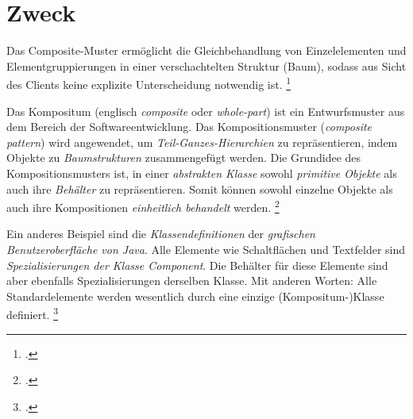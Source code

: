 \documentclass{bschlangaul-haupt}
\begin{document}
\section{Zweck}

Das Composite-Muster ermöglicht die Gleichbehandlung von Einzelelementen
und Elementgruppierungen in einer verschachtelten Struktur (\zB Baum),
sodass aus Sicht des Clients keine explizite Unterscheidung notwendig
ist.
\footcite[Seite 102]{eilebrecht}

%

Das Kompositum (englisch \emph{composite} oder \emph{whole-part}) ist
ein Entwurfsmuster aus dem Bereich der Softwareentwicklung. Das
Kompositionsmuster (\emph{composite pattern}) wird angewendet, um
\emph{Teil-Ganzes-Hierarchien} zu repräsentieren, indem Objekte zu
\emph{Baumstrukturen} zusammengefügt werden. Die Grundidee des
Kompositionsmusters ist, in einer \emph{abstrakten Klasse} sowohl
\emph{primitive Objekte} als auch ihre \emph{Behälter} zu
repräsentieren. Somit können sowohl einzelne Objekte als auch ihre
Kompositionen \emph{einheitlich behandelt} werden.
\footcite{aud:fs:4}

Ein anderes Beispiel sind die \emph{Klassendefinitionen} der
\emph{grafischen Benutzeroberfläche von Java}. Alle Elemente wie
Schaltflächen und Textfelder sind \emph{Spezialisierungen der Klasse
Component}. Die Behälter für diese Elemente sind aber ebenfalls
Spezialisierungen derselben Klasse. Mit anderen Worten: Alle
Standardelemente werden wesentlich durch eine einzige
(Kompositum-)Klasse definiert.
\footcite{wiki:kompositum}

\literatur
\end{document}
